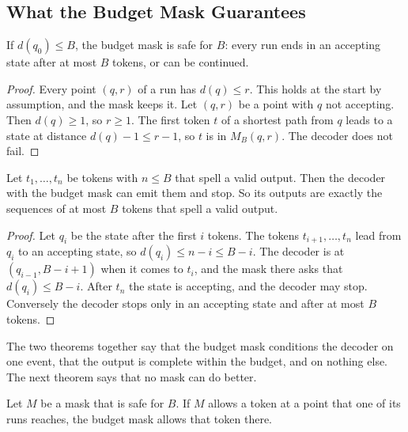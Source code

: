 \documentclass[acmsmall,nonacm,screen]{acmart}
\newcommand{\far}{d}
\begin{document}
\subsection{What the Budget Mask Guarantees}

\begin{theorem}[Safety]\label{thm:safe}
If $\far(q_0) \le B$, the budget mask is safe for $B$: every run ends in an accepting state
after at most $B$ tokens, or can be continued.
\end{theorem}

\begin{proof}
Every point $(q, r)$ of a run has $\far(q) \le r$. This holds at the start by assumption, and
the mask keeps it. Let $(q, r)$ be a point with $q$ not accepting. Then $\far(q) \ge 1$, so $r
\ge 1$. The first token $t$ of a shortest path from $q$ leads to a state at distance $\far(q)
- 1 \le r - 1$, so $t$ is in $M_B(q, r)$. The decoder does not fail.
\end{proof}

\begin{theorem}\label{thm:lost}
Let $t_1, \ldots, t_n$ be tokens with $n \le B$ that spell a valid output. Then the decoder
with the budget mask can emit them and stop. So its outputs are exactly the sequences of at
most $B$ tokens that spell a valid output.
\end{theorem}

\begin{proof}
Let $q_i$ be the state after the first $i$ tokens. The tokens $t_{i+1}, \ldots, t_n$ lead
from $q_i$ to an accepting state, so $\far(q_i) \le n - i \le B - i$. The decoder is at
$(q_{i-1}, B - i + 1)$ when it comes to $t_i$, and the mask there asks that $\far(q_i) \le B
- i$. After $t_n$ the state is accepting, and the decoder may stop. Conversely the decoder
stops only in an accepting state and after at most $B$ tokens.
\end{proof}

The two theorems together say that the budget mask conditions the decoder on one event,
that the output is complete within the budget, and on nothing else. The next theorem says
that no mask can do better.

\begin{theorem}\label{thm:greatest}
Let $M$ be a mask that is safe for $B$. If $M$ allows a token at a point that one of its runs
reaches, the budget mask allows that token there.
\end{theorem}
\end{document}
